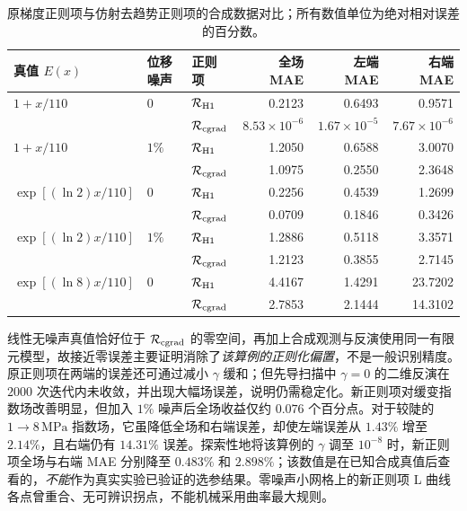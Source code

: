 \documentclass[11pt,a4paper]{ctexart}
\begin{document}
\begin{table}[htbp]
\centering
\small
\caption{原梯度正则项与仿射去趋势正则项的合成数据对比；所有数值单位为绝对相对误差的百分数。}
\label{tab:regularization_comparison}
\begin{tabular}{lllrrr}
\toprule
真值 $E(x)$ & 位移噪声 & 正则项 & 全场 MAE & 左端 MAE & 右端 MAE \\
\midrule
$1+x/110$ & $0$ & $\mathcal R_{\rm H1}$ & 0.2123 & 0.6493 & 0.9571 \\
             &     & $\mathcal R_{\rm cgrad}$ & $8.53\!\times\!10^{-6}$ & $1.67\!\times\!10^{-5}$ & $7.67\!\times\!10^{-6}$ \\
$1+x/110$ & $1\%$ & $\mathcal R_{\rm H1}$ & 1.2050 & 0.6588 & 3.0070 \\
             &        & $\mathcal R_{\rm cgrad}$ & 1.0975 & 0.2550 & 2.3648 \\
$\exp[(\ln2)x/110]$ & $0$ & $\mathcal R_{\rm H1}$ & 0.2256 & 0.4539 & 1.2699 \\
             &     & $\mathcal R_{\rm cgrad}$ & 0.0709 & 0.1846 & 0.3426 \\
$\exp[(\ln2)x/110]$ & $1\%$ & $\mathcal R_{\rm H1}$ & 1.2886 & 0.5118 & 3.3571 \\
             &        & $\mathcal R_{\rm cgrad}$ & 1.2123 & 0.3855 & 2.7145 \\
$\exp[(\ln8)x/110]$ & $0$ & $\mathcal R_{\rm H1}$ & 4.4167 & 1.4291 & 23.7202 \\
             &     & $\mathcal R_{\rm cgrad}$ & 2.7853 & 2.1444 & 14.3102 \\
\bottomrule
\end{tabular}
\end{table}

线性无噪声真值恰好位于 $\mathcal R_{\rm cgrad}$ 的零空间，再加上合成观测与反演使用同一有限元模型，故接近零误差主要证明消除了\emph{该算例的正则化偏置}，不是一般识别精度。原正则项在两端的误差还可通过减小 $\gamma$ 缓和；但先导扫描中 $\gamma=0$ 的二维反演在 $2000$ 次迭代内未收敛，并出现大幅场误差，说明仍需稳定化。新正则项对缓变指数场改善明显，但加入 $1\%$ 噪声后全场收益仅约 $0.076$ 个百分点。对于较陡的 $1\to8\,\mathrm{MPa}$ 指数场，它虽降低全场和右端误差，却使左端误差从 $1.43\%$ 增至 $2.14\%$，且右端仍有 $14.31\%$ 误差。探索性地将该算例的 $\gamma$ 调至 $10^{-8}$ 时，新正则项全场与右端 MAE 分别降至 $0.483\%$ 和 $2.898\%$；该数值是在已知合成真值后查看的，\emph{不能}作为真实实验已验证的选参结果。零噪声小网格上的新正则项 L 曲线各点曾重合、无可辨识拐点，不能机械采用曲率最大规则。
\end{document}
